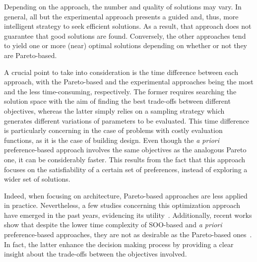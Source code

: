 	Depending on the approach, the number and quality of solutions may vary. In general, all but the experimental approach presents a guided and, thus, more intelligent strategy to seek efficient solutions. As a result, that approach does not guarantee that good solutions are found. Conversely, the other approaches tend to yield one or more (near) optimal solutions depending on whether or not they are Pareto-based.
	
	A crucial point to take into consideration is the time difference between each approach, with the Pareto-based and the experimental approaches being the most and the less time-consuming, respectively. The former requires searching the solution space with the aim of finding the best trade-offs between different objectives, whereas the latter simply relies on a sampling strategy which generates different variations of parameters to be evaluated. This time difference is particularly concerning in the case of problems with costly evaluation functions, as it is the case of building design. Even though the \textit{a priori} preference-based approach involves the same objectives as the analogous Pareto one, it can be considerably faster. This results from the fact that this approach focuses on the satisfiability of a certain set of preferences, instead of exploring a wider set of solutions.
	
	Indeed, when focusing on architecture, Pareto-based approaches are less applied in practice. Nevertheless, a few studies concerning this optimization approach have emerged in the past years, evidencing its utility~\cite{Evins2013,Hamdy2016}. Additionally, recent works show that despite the lower time complexity of \ac{SOO}-based and \textit{a priori} preference-based approaches, they are not as desirable as the Pareto-based ones~\cite{Attia2013,Cichocka2017SURVEY}. In fact, the latter enhance the decision making process by providing a clear insight about the trade-offs between the objectives involved. %

